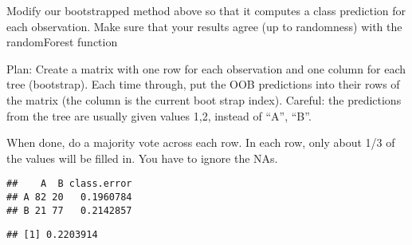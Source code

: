 \documentclass[]{article}
\newenvironment{Shaded}{\begin{snugshade}}{\end{snugshade}}
\newcommand{\DataTypeTok}[1]{\textcolor[rgb]{0.13,0.29,0.53}{#1}}
\newcommand{\DecValTok}[1]{\textcolor[rgb]{0.00,0.00,0.81}{#1}}
\newcommand{\KeywordTok}[1]{\textcolor[rgb]{0.13,0.29,0.53}{\textbf{#1}}}
\newcommand{\NormalTok}[1]{#1}
\newcommand{\OperatorTok}[1]{\textcolor[rgb]{0.81,0.36,0.00}{\textbf{#1}}}
\newcommand{\StringTok}[1]{\textcolor[rgb]{0.31,0.60,0.02}{#1}}
\begin{document}
Modify our bootstrapped method above so that it computes a class
prediction for each observation. Make sure that your results agree (up
to randomness) with the randomForest function

Plan: Create a matrix with one row for each observation and one column
for each tree (bootstrap). Each time through, put the OOB predictions
into their rows of the matrix (the column is the current boot strap
index). Careful: the predictions from the tree are usually given values
1,2, instead of ``A'', ``B''.

When done, do a majority vote across each row. In each row, only about
1/3 of the values will be filled in. You have to ignore the NAs.

\begin{Shaded}
\end{Shaded}

\begin{verbatim}
##    A  B class.error
## A 82 20   0.1960784
## B 21 77   0.2142857
\end{verbatim}

\begin{Shaded}
\end{Shaded}

\begin{verbatim}
## [1] 0.2203914
\end{verbatim}
\end{document}

